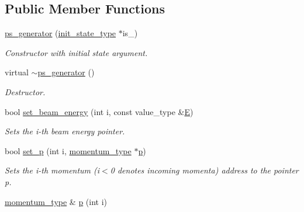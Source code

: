 \subsection*{Public Member Functions}
\begin{DoxyCompactItemize}
\item 
\hypertarget{a00450_a3c0bcf4553cb153ca1cec8dbc5aeb6ff}{}\hyperlink{a00450_a3c0bcf4553cb153ca1cec8dbc5aeb6ff}{ps\+\_\+generator} (\hyperlink{a00308}{init\+\_\+state\+\_\+type} $\ast$is\+\_\+)\label{a00450_a3c0bcf4553cb153ca1cec8dbc5aeb6ff}

\begin{DoxyCompactList}\small\item\em Constructor with initial state argument. \end{DoxyCompactList}\item 
\hypertarget{a00450_a36a9c90b1214d428727ce0970807b8c1}{}virtual \hyperlink{a00450_a36a9c90b1214d428727ce0970807b8c1}{$\sim$ps\+\_\+generator} ()\label{a00450_a36a9c90b1214d428727ce0970807b8c1}

\begin{DoxyCompactList}\small\item\em Destructor. \end{DoxyCompactList}\item 
\hypertarget{a00450_a0103bf74f672c6c088dfdc443c62d6b7}{}bool \hyperlink{a00450_a0103bf74f672c6c088dfdc443c62d6b7}{set\+\_\+beam\+\_\+energy} (int i, const value\+\_\+type \&\hyperlink{a00451_a8a2e0cd9b961dcfa2eb1ac7426cf3f5f}{E})\label{a00450_a0103bf74f672c6c088dfdc443c62d6b7}

\begin{DoxyCompactList}\small\item\em Sets the i-\/th beam energy pointer. \end{DoxyCompactList}\item 
bool \hyperlink{a00450_a5e4122d58de28c646e6d1c469ada86e7}{set\+\_\+p} (int i, \hyperlink{a00579}{momentum\+\_\+type} $\ast$\hyperlink{a00450_ac25aaa44a2bde95d582aac52f85fdfdf}{p})
\begin{DoxyCompactList}\small\item\em Sets the i-\/th momentum (i$<$0 denotes incoming momenta) address to the pointer p. \end{DoxyCompactList}\item 
\hypertarget{a00450_ac25aaa44a2bde95d582aac52f85fdfdf}{}\hyperlink{a00579}{momentum\+\_\+type} \& \hyperlink{a00450_ac25aaa44a2bde95d582aac52f85fdfdf}{p} (int i)\label{a00450_ac25aaa44a2bde95d582aac52f85fdfdf}


\end{DoxyCompactItemize}

